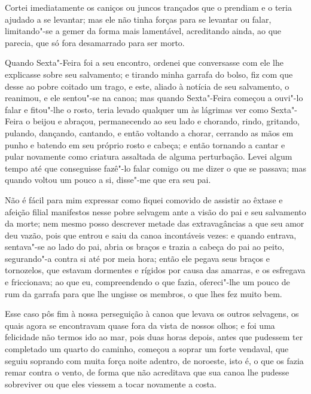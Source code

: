 Cortei imediatamente os caniços ou juncos trançados que o prendiam e o
teria ajudado a se levantar; mas ele não tinha forças para se levantar
ou falar, limitando"-se a gemer da forma mais lamentável, acreditando
ainda, ao que parecia, que só fora desamarrado para ser morto.

Quando Sexta"-Feira foi a seu encontro, ordenei que conversasse com ele
lhe explicasse sobre seu salvamento; e tirando minha garrafa do bolso,
fiz com que desse ao pobre coitado um trago, e este, aliado à notícia de
seu salvamento, o reanimou, e ele sentou"-se na canoa; mas quando
Sexta"-Feira começou a ouvi"-lo falar e fitou"-lhe o rosto, teria levado
qualquer um às lágrimas ver como Sexta"-Feira o beijou e abraçou,
permanecendo ao seu lado e
chorando, rindo, gritando,
pulando, dançando, cantando, e então voltando a chorar, cerrando as mãos
em punho e batendo em seu próprio rosto e cabeça; e então tornando a
cantar e pular novamente como criatura assaltada de alguma perturbação.
Levei algum tempo até que conseguisse fazê"-lo falar comigo ou me dizer o
que se passava; mas quando voltou um pouco a si, disse"-me que era seu
pai.

Não é fácil para mim expressar como fiquei comovido de assistir ao
êxtase e afeição filial manifestos nesse pobre selvagem ante a visão do
pai e seu salvamento da morte; nem mesmo posso descrever metade das
extravagâncias a que seu amor deu vazão, pois que entrou e saiu da canoa
incontáveis vezes: e quando entrava, sentava"-se ao lado do pai, abria os
braços e trazia a cabeça do pai ao peito, segurando"-a contra si até por
meia hora; então ele pegava seus braços e tornozelos, que estavam
dormentes e rígidos por causa das amarras, e os esfregava e friccionava;
ao que eu, compreendendo o que fazia, ofereci"-lhe um pouco de rum da
garrafa para que lhe ungisse os membros, o que lhes fez muito bem.

Esse caso pôs fim à nossa perseguição à canoa que levava os outros
selvagens, os quais agora se encontravam quase fora da vista de nossos
olhos; e foi uma felicidade não termos ido ao mar, pois duas horas
depois, antes que pudessem ter completado um quarto do caminho, começou
a soprar um forte vendaval, que seguiu soprando com muita força noite
adentro, de noroeste, isto é, o que os fazia remar contra o vento, de
forma que não acreditava que sua canoa lhe pudesse sobreviver ou que
eles viessem a tocar novamente a costa.

